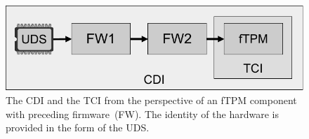 \begin{figure}[htpb]
  \centering
  \includegraphics[width=0.6\linewidth]{figures/identities.pdf}
  \caption{The \ac{CDI} and the \ac{TCI} from the perspective of an \ac{fTPM} component with preceding firmware~(FW). The identity of the hardware is provided in the form of the \ac{UDS}.}\label{fig:identities}
\end{figure}
